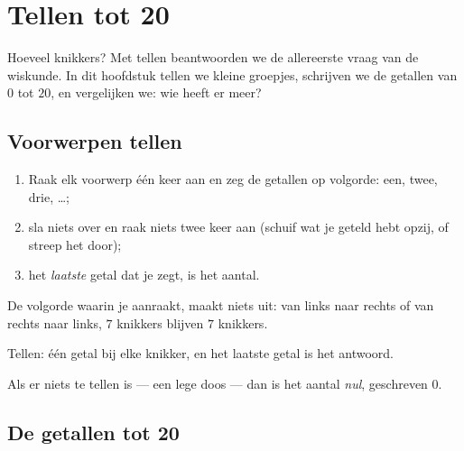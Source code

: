 \chapter{Tellen tot 20}\label{ch:g1:counting}

Hoeveel knikkers? Met tellen beantwoorden we de allereerste vraag van
de wiskunde. In dit hoofdstuk tellen we kleine groepjes, schrijven we
de getallen van $0$ tot $20$, en vergelijken we: wie heeft er meer?

\section{Voorwerpen tellen}

\begin{method}[Zo tel je]\label{met:g1:counting:how}
\begin{enumerate}
  \item Raak elk voorwerp één keer aan en zeg de getallen op volgorde:
        een, twee, drie, \dots;
  \item sla niets over en raak niets twee keer aan (schuif wat je
        geteld hebt opzij, of streep het door);
  \item het \emph{laatste} getal dat je zegt, is het aantal.
\end{enumerate}
De volgorde waarin je aanraakt, maakt niets uit: van links naar rechts
of van rechts naar links, $7$ knikkers blijven $7$ knikkers.
\end{method}

\begin{omfigure}

{\small Tellen: één getal bij elke knikker, en het laatste getal is
het antwoord.}
\end{omfigure}

\begin{definition}[Nul]\label{def:g1:counting:zero}
Als er niets te tellen is --- een lege doos --- dan is het aantal
\emph{nul}, geschreven $0$.
\end{definition}

\section{De getallen tot 20}

